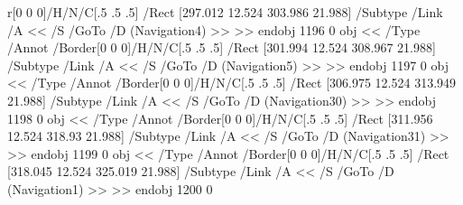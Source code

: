 r[0 0 0]/H/N/C[.5 .5 .5]
/Rect [297.012 12.524 303.986 21.988]
/Subtype /Link
/A << /S /GoTo /D (Navigation4) >>
>> endobj
1196 0 obj <<
/Type /Annot
/Border[0 0 0]/H/N/C[.5 .5 .5]
/Rect [301.994 12.524 308.967 21.988]
/Subtype /Link
/A << /S /GoTo /D (Navigation5) >>
>> endobj
1197 0 obj <<
/Type /Annot
/Border[0 0 0]/H/N/C[.5 .5 .5]
/Rect [306.975 12.524 313.949 21.988]
/Subtype /Link
/A << /S /GoTo /D (Navigation30) >>
>> endobj
1198 0 obj <<
/Type /Annot
/Border[0 0 0]/H/N/C[.5 .5 .5]
/Rect [311.956 12.524 318.93 21.988]
/Subtype /Link
/A << /S /GoTo /D (Navigation31) >>
>> endobj
1199 0 obj <<
/Type /Annot
/Border[0 0 0]/H/N/C[.5 .5 .5]
/Rect [318.045 12.524 325.019 21.988]
/Subtype /Link
/A << /S /GoTo /D (Navigation1) >>
>> endobj
1200 0
